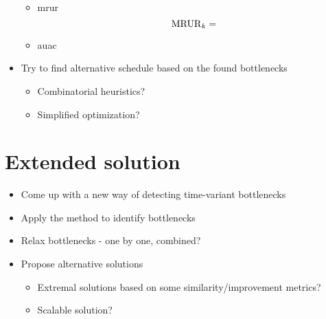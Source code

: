 \begin{itemize}
\begin{itemize}
        \item \ac{mrur}
        $$
        \operatorname{MRUR}_{k} = 
        $$

        \item \ac{auac}
    \end{itemize}

    \item Try to find alternative schedule based on the found bottlenecks
    \begin{itemize}
        \item Combinatorial heuristics?
        \item Simplified optimization?
    \end{itemize}
\end{itemize}

\section{Extended solution}

\begin{itemize}
    \item Come up with a new way of detecting time-variant bottlenecks
    \item Apply the method to identify bottlenecks
    \item Relax bottlenecks - one by one, combined?
    \item Propose alternative solutions
    \begin{itemize}
        \item Extremal solutions based on some similarity/improvement metrics?
        \item Scalable solution?
    \end{itemize}
\end{itemize}
